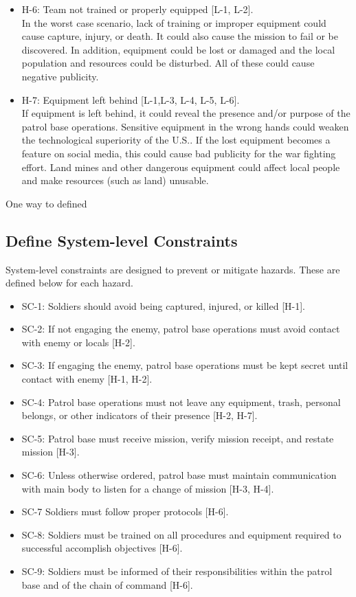 \documentclass[../../main/main.tex]{subfiles}
\begin{document}
\begin{itemize}
\item H-6: Team not trained or properly equipped [L-1, L-2].\\
In the worst case scenario, lack of training or improper equipment could cause capture, injury, or death.  It could also cause the mission to fail or be discovered.  In addition, equipment could be lost or damaged and the local population and resources could be disturbed.  All of these could cause negative publicity.

\item H-7: Equipment left behind [L-1,L-3, L-4, L-5, L-6].\\
If equipment is left behind, it could reveal the presence and/or purpose of the patrol base operations.  Sensitive equipment in the wrong hands could weaken the technological superiority of the U.S.. If the lost equipment becomes a feature on social media, this could cause bad publicity for the war fighting effort.  Land mines and other dangerous equipment could affect local people and make resources (such as land) unusable.
\end{itemize}

One way to defined

\subsection{Define System-level Constraints}
System-level constraints are designed to prevent or mitigate hazards.  These are defined below for each hazard.

\begin{itemize}
\item SC-1: Soldiers should avoid being captured, injured, or killed [H-1].
\item SC-2: If not engaging the enemy, patrol base operations must avoid contact with enemy or locals [H-2].
\item SC-3: If engaging the enemy, patrol base operations must be kept secret until contact with enemy [H-1, H-2].
\item SC-4: Patrol base operations must not leave any equipment, trash, personal belongs, or other indicators of their presence [H-2, H-7].
\item SC-5: Patrol base must receive mission, verify mission receipt, and restate mission [H-3].
\item SC-6: Unless otherwise ordered, patrol base must maintain communication with main body to listen for a change of mission [H-3, H-4].
\item SC-7 Soldiers must follow proper protocols [H-6].
\item SC-8: Soldiers must be trained on all procedures and equipment required to successful accomplish objectives [H-6].
\item SC-9: Soldiers must be informed of their responsibilities within the patrol base and of the chain of command [H-6].
\end{itemize}
\end{document}

